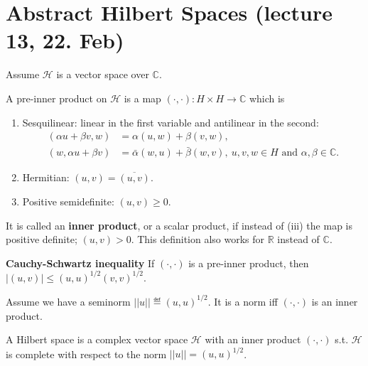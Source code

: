 \section{Abstract Hilbert Spaces (lecture 13, 22. Feb)}
Assume \(\mathcal{H}\) is a vector space over \(\mathbb{C}\).
\begin{definition}
    A pre-inner product on \(\mathcal{H}\) is a map \((\cdot,\cdot):H\times H\rightarrow\mathbb{C}\) which is
    \begin{enumerate}[label=(\roman*)]
        \item Sesquilinear: linear in the first variable and antilinear in the second:
        \begin{align*}
            (\alpha u + \beta v, w) &= \alpha(u,w) + \beta(v,w), \\
            (w, \alpha u + \beta v) &= \bar{\alpha}(w,u) + \bar{\beta}(w,v), \ u,v,w\in H \text{ and } \alpha,\beta\in\mathbb{C}.
        \end{align*}
        \item Hermitian: \((u,v)=\overline{(u,v)}\).
        \item Positive semidefinite: \((u,v)\geq 0\).
    \end{enumerate}
    It is called an \textbf{inner product}, or a scalar product, if instead of (iii) the map is positive definite; \((u,v)>0\). This definition
    also works for \(\mathbb{R}\) instead of \(\mathbb{C}\).
\end{definition}
\textbf{Cauchy-Schwartz inequality} If \((\cdot, \cdot)\) is a pre-inner product, then \(\vert (u,v)\vert \leq (u,u)^{1/2}(v,v)^{1/2}\).
\begin{corollary}
    Assume we have a seminorm \(||u||\eqdef (u,u)^{1/2}\). It is a norm iff \((\cdot,\cdot)\) is an inner product.
\end{corollary}
\begin{definition}
    A Hilbert space is a complex vector space \(\mathcal{H}\) with an inner product \((\cdot,\cdot)\) s.t. \(\mathcal{H}\) is complete with respect to the norm
    \(||u|| = (u,u)^{1/2}\).
\end{definition}

